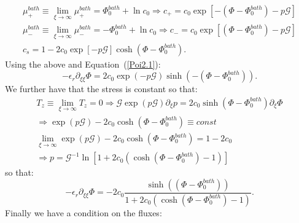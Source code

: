 \documentclass[12pt]{extarticle}
\begin{document}
\begin{gather}
\mu^{bath}_+\equiv \lim_{\xi\rightarrow \infty}\mu^{bath}_+= \Phi_0^{bath}+\ln c_0 \Rightarrow c_+ = c_0\exp[-(\Phi-\Phi_0^{bath})-p\mathcal{G}]\\
\mu^{bath}_-\equiv \lim_{\xi\rightarrow \infty}\mu^{bath}_-= -\Phi_0^{bath}+\ln c_0\Rightarrow c_- = c_0\exp[(\Phi-\Phi_0^{bath})-p\mathcal{G}]\\
 c_s = 1-2c_0\exp[-p\mathcal{G}]\cosh(\Phi-\Phi_0^{bath}).
\end{gather}
Using the above and Equation~(\ref{Poi2.1}):
\begin{equation}
-\epsilon_r\partial_{\xi\xi} \Phi = 2c_0\exp(-p\mathcal{G}) \sinh(-(\Phi-\Phi_0^{bath})).
\end{equation}
We further have that the stress is constant so that:
\begin{equation}
\begin{aligned}
T_z \equiv\lim_{\xi\rightarrow\infty}T_z=0 \Rightarrow \mathcal{G}\exp(p\mathcal{G})\partial_\xi p= 2c_0\sinh(\Phi-\Phi_0^{bath})\partial_\xi \Phi\\
\Rightarrow \exp(p\mathcal{G})-2c_0\cosh(\Phi-\Phi_0^{bath})\equiv const\\
\lim_{\xi\rightarrow\infty}\exp(p\mathcal{G})-2c_0\cosh(\Phi-\Phi_0^{bath}) =1-2c_0\\
 \Rightarrow p = \mathcal{G}^{-1}\ln\left[1+2c_0\left(\cosh(\Phi-\Phi_0^{bath})-1\right)\right] 
\end{aligned}
\end{equation}
so that:
\begin{equation}
-\epsilon_r\partial_{\xi\xi} \Phi =-2c_0 \frac{\sinh((\Phi-\Phi_0^{bath}))}{1+2c_0\left(\cosh(\Phi-\Phi_0^{bath})-1\right)}.
\end{equation}
Finally we have a condition on the fluxes:
\end{document}
